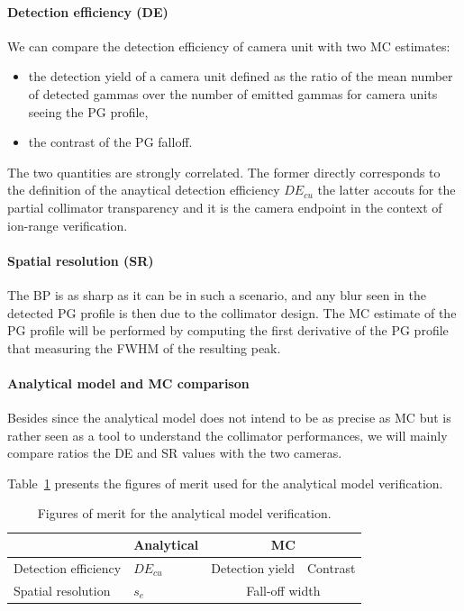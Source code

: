 \documentclass[a4paper,english]{article}
\begin{document}
\paragraph{Detection efficiency (DE)}

We can compare the detection efficiency of camera unit with two MC estimates:
\begin{itemize}
	\item the detection yield of a camera unit defined as the ratio of the mean number of detected gammas over the number of emitted gammas for camera units seeing the PG profile,
	\item the contrast of the PG falloff.
\end{itemize}
The two quantities are strongly correlated. The former directly corresponds to the definition of the anaytical detection efficiency $DE_{cu}$ the latter accouts for the partial collimator transparency and it is the camera endpoint in the context of ion-range verification.


\paragraph{Spatial resolution (SR)}
 The BP is as sharp as it can be in such a scenario, and any blur seen in the detected PG profile is then due to the collimator design. The MC estimate of the PG profile will be performed by computing the first derivative of the PG profile that measuring the FWHM of the resulting peak.

\paragraph{Analytical model and MC comparison}

Besides since the analytical model does not intend to be as precise as MC but is rather seen as a tool to understand the collimator performances, we will mainly compare ratios the DE and SR values with the two cameras.

Table~\ref{table:FOM} presents the figures of merit used for the analytical model verification.

\begin{table}
\centering
\begin{tabular}{|l|l|c|c|}
	\hline
						& Analytical & \multicolumn{2}{c|}{ MC}\\
	\hline
	Detection efficiency	& $DE_{cu}$	& Detection yield & Contrast \\
	\hline
	Spatial resolution & $s_e$								& \multicolumn{2}{c|}{Fall-off width}\\
	\hline	
\end{tabular}
\caption{Figures of merit for the analytical model verification.}
\label{table:FOM}
\end{table}
\end{document}

